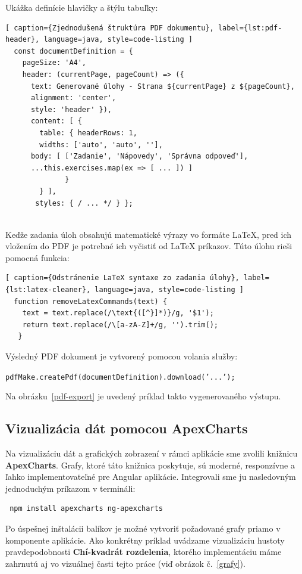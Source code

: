  Ukážka definície hlavičky a štýlu tabuľky:
 
 \begin{lstlisting}[ caption={Zjednodušená štruktúra PDF dokumentu}, label={lst:pdf-header}, language=java, style=code-listing ] 
  const documentDefinition = { 
    pageSize: 'A4', 
    header: (currentPage, pageCount) => ({ 
      text: Generované úlohy - Strana ${currentPage} z ${pageCount}, 
      alignment: 'center', 
      style: 'header' }), 
      content: [ { 
        table: { headerRows: 1, 
        widths: ['auto', 'auto', ''], 
      body: [ ['Zadanie', 'Nápovedy', 'Správna odpoveď'],
      ...this.exercises.map(ex => [ ... ]) ] 
              } 
        } ],
       styles: { / ... */ } }; 
      
      \end{lstlisting}
 
 Keďže zadania úloh obsahujú matematické výrazy vo formáte LaTeX, pred ich vložením do PDF je potrebné ich vyčistiť od LaTeX príkazov. Túto úlohu rieši pomocná funkcia:
 
 \begin{lstlisting}[ caption={Odstránenie LaTeX syntaxe zo zadania úlohy}, label={lst:latex-cleaner}, language=java, style=code-listing ] 
  function removeLatexCommands(text) { 
    text = text.replace(/\text{([^}]*)}/g, '$1');
    return text.replace(/\[a-zA-Z]+/g, '').trim(); 
   }
   \end{lstlisting}
 
 Výsledný PDF dokument je vytvorený pomocou volania služby: 
 
 \texttt{pdfMake.createPdf(documentDefinition).download('...');}
 
 Na obrázku~\ref{pdf-export} je uvedený príklad takto vygenerovaného výstupu.
\subsection{Vizualizácia dát pomocou ApexCharts}

Na vizualizáciu dát a grafických zobrazení v rámci aplikácie sme zvolili knižnicu \textbf{ApexCharts}. 
Grafy, ktoré táto knižnica poskytuje, sú moderné, responzívne a ľahko implementovateľné pre Angular aplikácie.
 Integrovali sme ju nasledovným jednoduchým príkazom v termináli: 
 
 \begin{verbatim} npm install apexcharts ng-apexcharts \end{verbatim}
 
 Po úspešnej inštalácii balíkov je možné vytvoriť požadované grafy priamo v komponente aplikácie. 
 Ako konkrétny príklad uvádzame vizualizáciu hustoty pravdepodobnosti \textbf{Chí-kvadrát rozdelenia}, ktorého implementáciu máme zahrnutú aj vo vizuálnej časti tejto práce (viď obrázok č.~\ref{grafy}).
 
